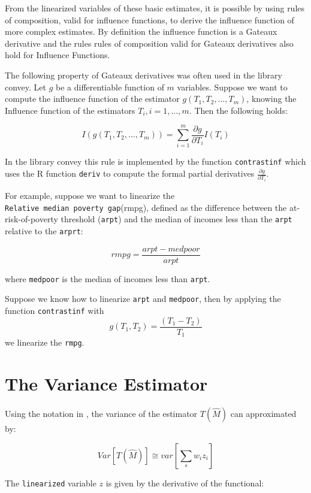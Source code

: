 \documentclass[]{book}
\begin{document}
From the linearized variables of these basic estimates, it is possible by using rules of composition, valid for influence functions, to derive the influence function of more complex estimates. By definition the influence function is a Gateaux derivative and the rules rules of composition valid for Gateaux derivatives also hold for Influence Functions.

The following property of Gateaux derivatives was often used in the library convey. Let \(g\) be a differentiable function of \(m\) variables. Suppose we want to compute the influence function of the estimator \(g(T_1, T_2,\ldots, T_m)\), knowing the Influence function of the estimators \(T_i, i=1,\ldots, m\). Then the following holds:

\[
I(g(T_1, T_2,\ldots, T_m)) = \sum_{i=1}^m \frac{\partial g}{\partial T_i}I(T_i)
\]

In the library convey this rule is implemented by the function \texttt{contrastinf} which uses the R function \texttt{deriv} to compute the formal partial derivatives \(\frac{\partial g}{\partial T_i}\).

For example, suppose we want to linearize the \texttt{Relative\ median\ poverty\ gap}(rmpg), defined as the difference between the at-risk-of-poverty threshold (\texttt{arpt}) and the median of incomes less than the \texttt{arpt} relative to the \texttt{arprt}:

\[
rmpg= \frac{arpt-medpoor} {arpt}
\]

where \texttt{medpoor} is the median of incomes less than \texttt{arpt}.

Suppose we know how to linearize \texttt{arpt} and \texttt{medpoor}, then by applying the function \texttt{contrastinf} with
\[
g(T_1,T_2)= \frac{(T_1 - T_2)}{T_1}
\]
we linearize the \texttt{rmpg}.

\hypertarget{the-variance-estimator}{%
\section{The Variance Estimator}\label{the-variance-estimator}}

Using the notation in \citet{osier2009}, the variance of the estimator \(T(\hat{M})\) can approximated by:

\begin{equation}
Var\left[T(\hat{M})\right]\cong var\left[\sum_s w_i z_i\right]
\label{eq:var}
\end{equation}

The \texttt{linearized} variable \(z\) is given by the derivative of the functional:
\end{document}
